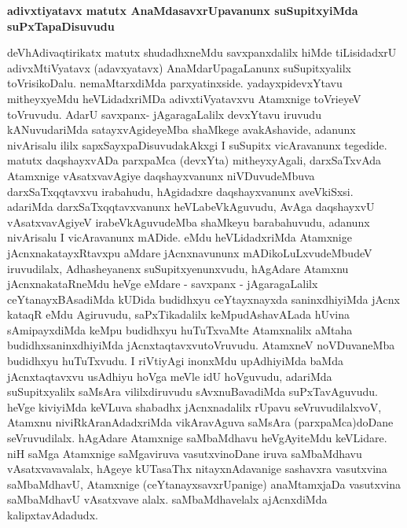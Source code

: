 \begin{center}
\begin{artha}
\bf{adivxtiyatavx matutx AnaMdasavxrUpavanunx suSupitxyiMda suPxTapaDisuvudu}
\end{artha}
\end{center}

\begin{artha}
deVhAdivaqtirikatx matutx shudadhxneMdu savxpanxdalilx hiMde
tiLisidadxrU adivxMtiVyatavx  (adavxyatavx) AnaMdarUpagaLanunx
suSupitxyalilx toVrisikoDalu. 
nemaMtarxdiMda parxyatinxside. yadayxpidevxYtavu mitheyxyeMdu heVLidadxriMDa
adivxtiVyatavxvu Atamxnige toVrieyeV  toVruvudu. AdarU savxpanx-
jAgaragaLalilx devxYtavu iruvudu kANuvudariMda satayxvAgideyeMba
shaMkege avakAshavide, adanunx nivArisalu ililx
sapxSayxpaDisuvudakAkxgi I suSupitx vicAravanunx tegedide. matutx
daqshayxvADa parxpaMca (devxYta) mitheyxyAgali, darxSaTxvAda Atamxnige
vAsatxvavAgiye daqshayxvanunx niVDuvudeMbuva darxSaTxqqtavxvu
irabahudu, hAgidadxre daqshayxvanunx aveVkiSxsi. adariMda
darxSaTxqqtavxvanunx heVLabeVkAguvudu, AvAga daqshayxvU
vAsatxvavAgiyeV irabeVkAguvudeMba shaMkeyu barabahuvudu, adanunx
nivArisalu I vicAravanunx mADide. eMdu heVLidadxriMda Atamxnige
jAcnxnakatayxRtavxpu aMdare jAcnxnavununx mADikoLuLxvudeMbudeV
iruvudilalx, Adhasheyanenx suSupitxyenunxvudu, hAgAdare Atamxnu
jAcnxnakataRneMdu heVge eMdare - savxpanx - jAgaragaLalilx
ceYtanayxBAsadiMda kUDida budidhxyu ceYtayxnayxda saninxdhiyiMda jAcnx
kataqR eMdu Agiruvudu, saPxTikadalilx keMpudAshavALada hUvina
sAmipayxdiMda keMpu budidhxyu huTuTxvaMte Atamxnalilx aMtaha
budidhxsaninxdhiyiMda jAcnxtaqtavxvutoVruvudu. AtamxneV noVDuvaneMba
budidhxyu huTuTxvudu. I riVtiyAgi inonxMdu upAdhiyiMda baMda
jAcnxtaqtavxvu usAdhiyu hoVga meVle idU hoVguvudu, adariMda
suSupitxyalilx saMsAra vililxdiruvudu sAvxnuBavadiMda
suPxTavAguvudu. heVge kiviyiMda keVLuva shabadhx jAcnxnadalilx rUpavu
seVruvudilalxvoV, Atamxnu niviRkAranAdadxriMda vikAravAguva saMsAra
(parxpaMca)doDane seVruvudilalx. hAgAdare Atamxnige saMbaMdhavu
heVgAyiteMdu keVLidare. niH saMga Atamxnige saMgaviruva
vasutxvinoDane iruva saMbaMdhavu vAsatxvavavalalx, hAgeye kUTasaThx
nitayxnAdavanige sashavxra vasutxvina saMbaMdhavU, Atamxnige
(ceYtanayxsavxrUpanige) anaMtamxjaDa vasutxvina saMbaMdhavU
vAsatxvave alalx. saMbaMdhavelalx ajAcnxdiMda kalipxtavAdadudx.
\end{artha}


